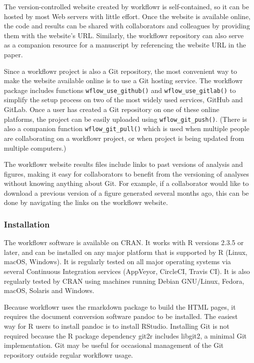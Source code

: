 \documentclass[9pt,a4paper]{extarticle}
\begin{document}
The version-controlled website created by workflowr is self-contained,
so it can be hosted by most Web servers with little effort. Once the
website is available online, the code and results can be shared with
collaborators and colleagues by providing them with the website's URL.
Similarly, the workflowr repository can also serve as a companion
resource for a manuscript by referencing the website URL in the paper.

Since a workflowr project is also a Git repository, the most convenient
way to make the website available online is to use a Git hosting
service. The workflowr package includes functions \texttt{wflow\_use\_github()} and
\texttt{wflow\_use\_gitlab()} to simplify the setup process on two of the most
widely used services, GitHub and GitLab. Once a user has created a Git
repository on one of these online platforms, the project can be easily
uploaded using \texttt{wflow\_git\_push()}. (There is also a companion function
\texttt{wflow\_git\_pull()} which is used when multiple people are collaborating on
a workflowr project, or when project is being updated from multiple
computers.)

The workflowr website results files include links to past versions of
analysis and figures, making it easy for collaborators to benefit from
the versioning of analyses without knowing anything about Git. For
example, if a collaborator would like to download a previous version of
a figure generated several months ago, this can be done by navigating
the links on the workflowr website.

\subsubsection*{Installation}

The workflowr software is available on CRAN. It works with R versions
2.3.5 or later, and can be installed on any major platform that is
supported by R (Linux, macOS, Windows). It is regularly tested on all
major operating systems via several Continuous Integration services
(AppVeyor, CircleCI, Travis CI). It is also regularly tested by CRAN
using machines running Debian GNU/Linux, Fedora, macOS, Solaris and
Windows.

Because workflowr uses the rmarkdown package to build the HTML pages, it
requires the document conversion software pandoc to be installed. The
easiest way for R users to install pandoc is to install RStudio.
Installing Git is not required because the R package dependency git2r
includes libgit2, a minimal Git implementation. Git may be useful for
occasional management of the Git repository outside regular workflowr
usage.
\end{document}
